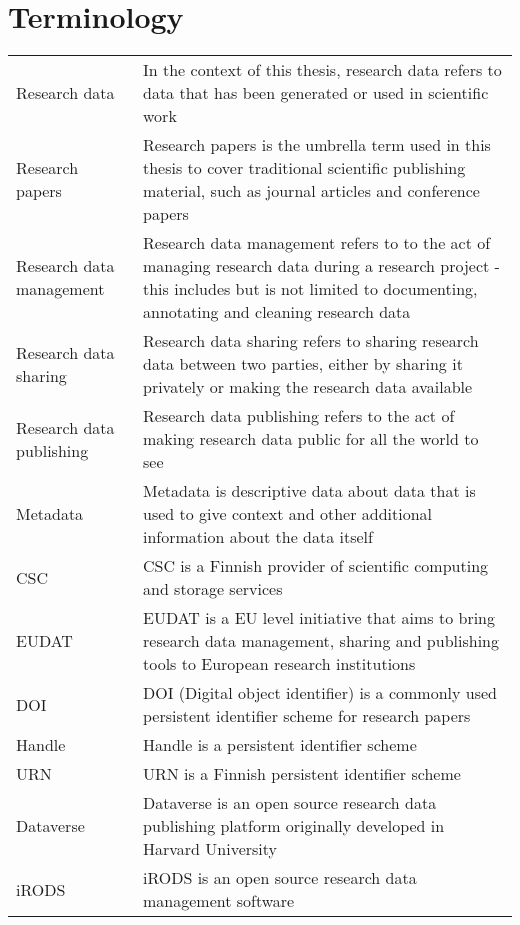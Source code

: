 \chapter*{Terminology}
{}



\noindent
\begin{longtable}{@{}p{}p{}@{}}
Research data & In the context of this thesis, research data refers to data that
has been generated or used in scientific work\\
Research papers & Research papers is the umbrella term used in this thesis to cover
traditional scientific publishing material, such as journal articles and conference papers\\
Research data management & Research data management refers to to the act of managing research
data during a research project - this includes but is not limited to documenting, annotating and
cleaning research data \\
Research data sharing & Research data sharing refers to sharing research data between two parties,
either by sharing it privately or making the research data available \\
Research data publishing & Research data publishing refers to the act of making research data
public for all the world to see \\
Metadata & Metadata is descriptive data about data that is used to give context and other
additional information about the data itself\\ 
CSC  & CSC is a Finnish provider of scientific computing and storage services\\ 
EUDAT& EUDAT is a EU level initiative that aims to bring research data management, sharing and
publishing tools to European research institutions\\ 
DOI & DOI (Digital object identifier) is a commonly used persistent identifier scheme for research papers \\
Handle & Handle is a persistent identifier scheme \\
URN & URN is a Finnish persistent identifier scheme \\
Dataverse & Dataverse is an open source research data publishing platform originally developed in Harvard University \\
iRODS & iRODS is an open source research data management software \\

\end{longtable}
